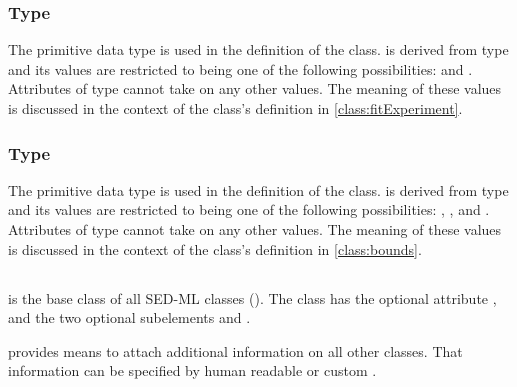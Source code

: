 \begin{blockChanged}
\subsubsection[\element{ExperimentType}]{Type }
\label{type:experimentType}

The  primitive data type is used in the definition of the \FitExperiment class.   is derived from type  and its values are restricted to being one of the following possibilities:  and .  Attributes of type  cannot take on any other values.  The meaning of these values is discussed in the context of the \FitExperiment class's definition in \ref{class:fitExperiment}.


\subsubsection[\element{ScaleType}]{Type }
\label{type:scaleType}

The  primitive data type is used in the definition of the \Bounds class.   is derived from type  and its values are restricted to being one of the following possibilities: , , and .  Attributes of type  cannot take on any other values.  The meaning of these values is discussed in the context of the \Bounds class's definition in \ref{class:bounds}.


\end{blockChanged}


\subsection{}
\label{class:sedBase}
 is the base class of all SED-ML classes (). The  class has the optional attribute \hyperref[sec:metaid]{}, and the two optional subelements \hyperref[sec:notesElement]{} and \hyperref[sec:annotationElement]{}. 

 provides means to attach additional information on all other classes. That information can be specified by human readable \Notes or custom \Annotation.

